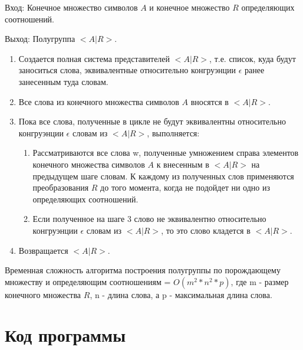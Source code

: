 \documentclass[bachelor, och, labwork]{shiza}
\begin{document}
	$\textit{Вход:}$ Конечное множество символов $A$ и конечное множество $R$ определяющих соотношений.
	
	$\textit{Выход:}$  Полугруппа $<A|R>$.
	
	\begin{enumerate} 
		\item Создается полная система представителей $<A|R>$, т.е. список, куда будут заноситься слова, эквивалентные относительно конгруэнции $\epsilon$ ранее занесенным туда словам.
		\item Все слова из конечного множества символов $A$ вносятся в $<A|R>$.
		\item Пока все слова, полученные в цикле не будут эквивалентны относительно конгруэнции $\epsilon$ словам из $<A|R>$, выполняется: 
		\begin{enumerate} 
			\item Рассматриваются все слова w, полученные умножением справа элементов конечного множества символов $A$ к внесенным в $<A|R>$ на предыдущем шаге словам. К каждому из полученных слов применяются преобразования $R$ до того момента, когда не подойдет ни одно из определяющих соотношений. 
			\item Если полученное на шаге 3 слово не эквивалентно относительно конгруэнции $\epsilon$ словам из $<A|R>$, то это слово кладется в $<A|R>$.
		\end{enumerate} 
	\item Возвращается $<A|R>$.
	\end{enumerate} 

	Временная сложность алгоритма построения полугруппы по порождающему множеству и определяющим соотношениям = $O(m^2 * n^2 * p)$, где m - размер конечного множества $R$, n - длина слова, а  p - максимальная длина слова.

	\section{Код программы}		
	
\end{document}
